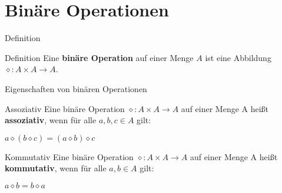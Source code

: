 \section{Binäre Operationen}

\begin{frame}{Definition}
    \begin{block}{Definition}
          Eine \textbf{binäre Operation} auf einer Menge $A$ ist eine Abbildung $\diamond: A \times A \to A$.
    \end{block}
\end{frame}



\begin{frame}{Eigenschaften von binären Operationen}
  \begin{block}{Assoziativ}
    Eine binäre Operation $\diamond: A \times A \to A$ auf einer Menge A heißt \textbf{assoziativ}, wenn für alle $a, b, c \in A$ gilt:
    \begin{center}
        $a \diamond (b \diamond c) = (a \diamond b) \diamond c$
    \end{center}
  \end{block}
  \begin{block}{Kommutativ}
    Eine binäre Operation $\diamond: A \times A \to A$ auf einer Menge A heißt \textbf{kommutativ}, wenn für alle $a, b \in A$ gilt:
    \begin{center}
        $a \diamond b = b \diamond a$
    \end{center}
  \end{block}
\end{frame}

